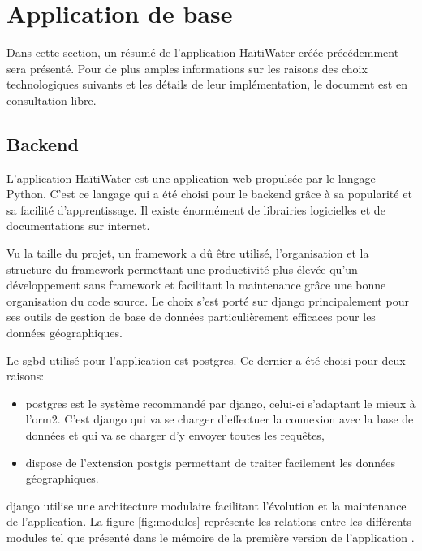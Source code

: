 \documentclass{EPL-master-thesis-covers-FR}
\begin{document}
		\section{Application de base}
			Dans cette section, un résumé de l'application HaïtiWater créée précédemment sera présenté. Pour de plus amples informations sur les raisons des choix technologiques suivants et les détails de leur implémentation, le document \cite{ref:haitiwater} est en consultation libre.
			
			\subsection*{Backend}
				L'application HaïtiWater est une application web propulsée par le langage Python. C'est ce langage qui a été choisi pour le backend grâce à sa popularité et sa facilité d'apprentissage. Il existe énormément de librairies logicielles et de documentations sur internet.
				
				Vu la taille du projet, un \gls{framework} a dû être utilisé, l'organisation et la structure du framework permettant une productivité plus élevée qu'un développement sans \gls{framework} et facilitant la maintenance grâce une bonne organisation du code source. Le choix s'est porté sur \Gls{django} principalement pour ses outils de gestion de base de données particulièrement efficaces pour les données géographiques.	
			
				Le \gls{sgbd} utilisé pour l'application est \gls{postgres}. Ce dernier a été choisi pour deux raisons:
				\begin{itemize}
					\item \gls{postgres} est le système recommandé par \Gls{django}, celui-ci s'adaptant le mieux à l'\gls{orm2}. C'est \Gls{django} qui va se charger d'effectuer la connexion avec la base de données et qui va se charger d'y envoyer toutes les requêtes,
					\item dispose de l'extension \gls{postgis} permettant de traiter facilement les données géographiques.
				\end{itemize}			
				
				\Gls{django} utilise une architecture modulaire facilitant l'évolution et la maintenance de l'application. La figure \ref{fig:modules} représente les relations entre les différents modules tel que présenté dans le mémoire de la première version de l'application \cite{ref:haitiwater}.
				
\end{document}
